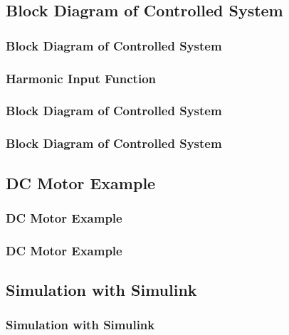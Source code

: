 \documentclass[fleqn]{beamer} %
\newcommand{\sectionIIsubsectionItitle}{Block Diagram of Controlled System}
\newcommand{\sectionIIsubsectionIItitle}{DC Motor Example}
\newcommand{\sectionIIsubsectionIIItitle}{Simulation with Simulink}
\begin{document}
		\subsection{\sectionIIsubsectionItitle}\label{sectionIIsubsectionI}

			\begin{frame}[label=sectionIIsubsectionI]
				\frametitle{\sectionIIsubsectionItitle}
				\bigskip

				\frametitle{Harmonic Input Function}
				
				\btVFill
			\end{frame}

			\begin{frame}[label=sectionIIsubsectionI]
				\frametitle{\sectionIIsubsectionItitle}
				\bigskip

				\btVFill
			\end{frame}

			\begin{frame}[label=sectionIIsubsectionI]
				\frametitle{\sectionIIsubsectionItitle}
				\bigskip

				\btVFill
			\end{frame}


		\subsection{\sectionIIsubsectionIItitle}\label{sectionIIsubsectionII}

			\begin{frame}

				\frametitle{\sectionIIsubsectionIItitle}
				\bigskip

				\btVFill 
			\end{frame}

			\begin{frame}

				\frametitle{\sectionIIsubsectionIItitle}
				\bigskip

				\btVFill 
			\end{frame}




		\subsection{\sectionIIsubsectionIIItitle}\label{sectionIIsubsectionIII}

			\begin{frame}
				\frametitle{\sectionIIsubsectionIIItitle}
				\bigskip


				\btVFill 
			\end{frame}	
\end{document}
